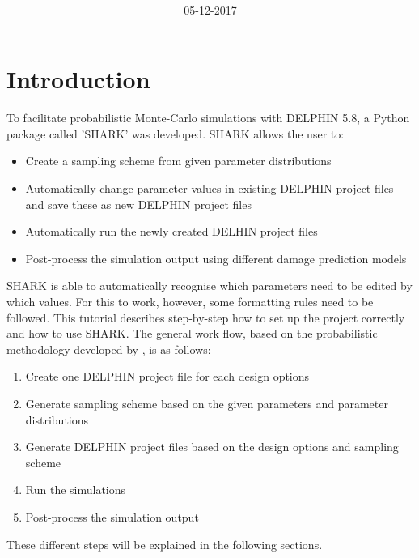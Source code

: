 \documentclass{article}
\title{
\textmd{\textbf{\Title}}\\
\normalsize\vspace{0.3cm}
\large{\SubTitle}
\vspace{1cm}
}
\author{\textbf{\AuthorName}\\
\small{\AuthorEmail}
}
\date{05-12-2017}
\begin{document}
\maketitle

\tableofcontents
\newpage

\section{Introduction}
To facilitate probabilistic Monte-Carlo simulations with DELPHIN 5.8, a Python package called 'SHARK' was developed. SHARK allows the user to:
\begin{itemize}
	\item Create a sampling scheme from given parameter distributions
	\item Automatically change parameter values in existing DELPHIN project files and save these as new DELPHIN project files
	\item Automatically run the newly created DELHIN project files
	\item Post-process the simulation output using different damage prediction models
\end{itemize}
SHARK is able to automatically recognise which parameters need to be edited by which values. For this to work, however, some formatting rules need to be followed. This tutorial describes step-by-step how to set up the project correctly and how to use SHARK. The general work flow, based on the probabilistic methodology developed by \citet{VanGelder2014a}, is as follows:
\begin{enumerate}
	\item Create one DELPHIN project file for each design options
	\item Generate sampling scheme based on the given parameters and parameter distributions
	\item Generate DELPHIN project files based on the design options and sampling scheme
	\item Run the simulations
	\item Post-process the simulation output 
\end{enumerate}
These different steps will be explained in the following sections.
\end{document}
